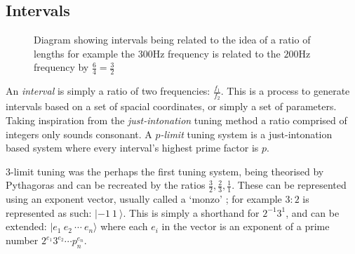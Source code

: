 \subsection{Intervals}
\begin{figure}[H]
    \centering
    \caption{Diagram showing intervals being related to the idea of a ratio of
    lengths for example the $300\si{\hertz}$ frequency is related to the
    $200\si{\hertz}$ frequency by $\frac{6}{4} = \frac{3}{2}$}
\end{figure}

An \emph{interval} is simply a ratio of two frequencies: $\frac{f_1}{f_2}$.
This is a process to generate intervals based on a set of spacial coordinates,
or simply a set of parameters. Taking inspiration from the
\emph{just-intonation} tuning method a ratio comprised of integers only sounds
consonant. A \emph{$p$-limit} tuning system is a just-intonation based system
where every interval's highest prime factor is $p$. \citep[p.76,
109]{partch1974genesis}

3-limit tuning was the perhaps the first tuning system, being theorised by
Pythagoras and can be recreated by the ratios $\frac{3}{2}, \frac{2}{3},
\frac{1}{1}$. These can be represented using an exponent vector, usually called
a `monzo' \citep{monzo_2005}; for example $3:2$ is represented as such: $|-1\ 1\
\rangle$.  This is simply a shorthand for $2^{-1} 3^1$, and can be extended:
$|e_1\ e_2\ \cdots\ e_n\rangle$ where each $e_i$ in the vector is an exponent of
a prime number $2^{e_1} 3^{e_2} \cdots p_n^{e_n}$. 

